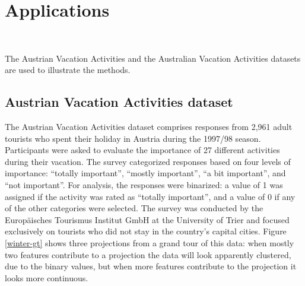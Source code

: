 \documentclass[article]{ajs}
\begin{document}
\section{Applications}~\label{applications}

The Austrian Vacation Activities \cite{dolnicar2003winter} and the Australian Vacation Activities \cite{cliff2009formative} datasets are used to illustrate the methods.

\subsection{Austrian Vacation Activities dataset}

The Austrian Vacation Activities dataset comprises responses from 2,961 adult tourists who spent their holiday in Austria during the 1997/98 season. Participants were asked to evaluate the importance of 27 different activities during their vacation. The survey categorized responses based on four levels of importance: ``totally important'', ``mostly important'', ``a bit important'', and ``not important''. For analysis, the responses were binarized: a value of 1 was assigned if the activity was rated as ``totally important'', and a value of 0 if any of the other categories were selected. The survey was conducted by the Europäisches Tourismus Institut GmbH at the University of Trier and focused exclusively on tourists who did not stay in the country's capital cities. Figure \ref{winter-gt} shows three projections from a grand tour of this data: when mostly two features contribute to a projection the data will look apparently clustered, due to the binary values, but when more features contribute to the projection it looks more continuous. 
\end{document}
